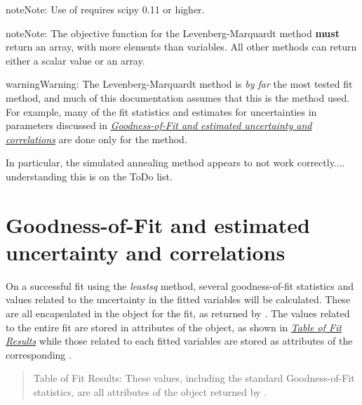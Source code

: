 \documentclass[letterpaper,10pt,english]{sphinxmanual}
\begin{document}
\begin{notice}{note}{Note:}
Use of  requires scipy 0.11 or higher.
\end{notice}

\begin{notice}{note}{Note:}
The objective function for the Levenberg-Marquardt method \textbf{must} return an array,
with more elements than variables.  All other methods can return either a scalar value
or an array.
\end{notice}

\begin{notice}{warning}{Warning:}
The Levenberg-Marquardt method is \emph{by far} the most tested fit method,
and much of this documentation assumes that this is the method used.  For
example, many of the fit statistics and estimates for uncertainties in
parameters discussed in {\hyperref[fitting:fit-results-label]{\emph{Goodness-of-Fit and estimated uncertainty and correlations}}} are done only for the
 method.
\end{notice}

In particular, the simulated annealing method appears to not work
correctly.... understanding this is on the ToDo list.


\section{Goodness-of-Fit and estimated uncertainty and correlations}
\label{fitting:fit-results-label}\label{fitting:goodness-of-fit-and-estimated-uncertainty-and-correlations}
On a successful fit using the \emph{leastsq} method, several goodness-of-fit
statistics and values related to the uncertainty in the fitted variables will be
calculated.  These are all encapsulated in the {\hyperref[fitting:Minimizer]{}} object for the
fit, as returned by {\hyperref[fitting:minimize]{}}.  The values related to the entire fit are
stored in attributes of the {\hyperref[fitting:Minimizer]{}} object, as shown in {\hyperref[fitting:goodfit-table]{\emph{Table
of Fit Results}}} while those related to each fitted variables are
stored as attributes of the corresponding {\hyperref[parameters:Parameter]{}}.
\label{fitting:goodfit-table}\begin{quote}

Table of Fit Results:  These values, including the standard Goodness-of-Fit statistics,
are all attributes of the {\hyperref[fitting:Minimizer]{}} object returned by {\hyperref[fitting:minimize]{}}.
\end{quote}
\end{document}
